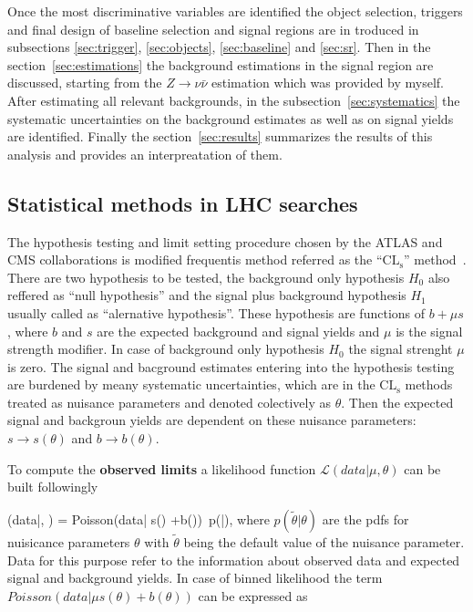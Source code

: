 Once the most discriminative variables are identified the object selection, triggers and final design of baseline selection and signal regions are in troduced in subsections \ref{sec:trigger}, \ref{sec:objects}, \ref{sec:baseline} and \ref{sec:sr}. Then in the section~\ref{sec:estimations} the background estimations in the signal region are discussed, starting from the $Z \to \nu \bar{\nu}$ estimation which was provided by myself. After estimating all relevant backgrounds, in the subsection~\ref{sec:systematics} the systematic uncertainties on the background estimates as well as on signal yields are identified. Finally the section~\ref{sec:results} summarizes the results of this analysis and provides an interpreatation of them. 



\subsection{Statistical methods in LHC searches~\label{sec:stats} }

The hypothesis testing and limit setting procedure chosen by the ATLAS and CMS collaborations is modified frequentis method referred as the ``$\mathrm{CL_{s}}$'' method~\cite{Read:2002hq, Junk:1999kv, Cowan:2010js, CMS-NOTE-2011-005}. There are two hypothesis to be tested, the background only hypothesis $H_{0}$ also reffered as ``null hypothesis'' and the signal plus background hypothesis $H_{1}$ usually called as ``alernative hypothesis''. These hypothesis are functions of $b+\mu s$, where $b$ and $s$ are the expected background and signal yields and $\mu$ is the signal strength modifier. In case of background only hypothesis $H_{0}$ the signal strenght $\mu$ is zero. The signal and bacground estimates entering into the hypothesis testing are burdened by meany systematic uncertainties, which are in the $\mathrm{CL_{s}}$ methods treated as nuisance parameters and denoted colectively as $\theta$. Then the expected signal and backgroun yields are dependent on these nuisance parameters: $s \to s(\theta)$ and $b \to b(\theta)$.

To compute the \textbf{observed limits} a likelihood function $\mathcal{L}(data|\mu, \theta)$ can be built followingly

{
(data|\mu, \theta) = Poisson(data| \mu s(\theta) +b(\theta))~p(\tilde{\theta}|\theta),
}
where $p(\tilde{\theta}|\theta)$ are the pdfs for nuisicance parameters $\theta$ with $\tilde{\theta}$ being the default value of the nuisance parameter. Data for this purpose refer to the information about observed data and expected signal and background yields. In case of binned likelihood the term $Poisson(data| \mu s(\theta) +b(\theta))$ can be expressed as


